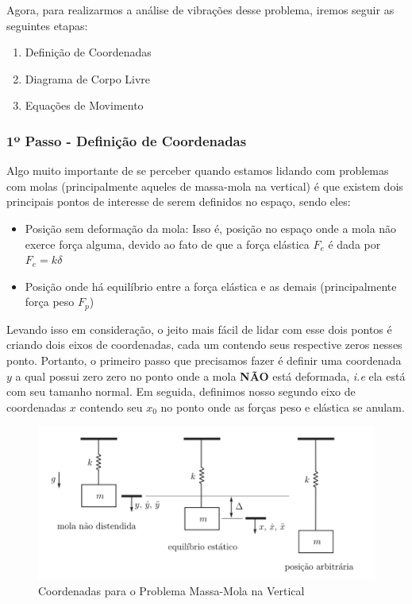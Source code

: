 \documentclass{article}
\begin{document}
                Agora, para realizarmos a análise de vibrações desse problema, iremos seguir as seguintes etapas:
                \begin{enumerate}
                    \item Definição de Coordenadas
                    \item Diagrama de Corpo Livre
                    \item Equações de Movimento
                \end{enumerate}

                \subsubsection*{1º Passo - Definição de Coordenadas}

                    Algo muito importante de se perceber quando estamos lidando com problemas com molas (principalmente aqueles de massa-mola na vertical) é que existem dois principais pontos de
                    interesse de serem definidos no espaço, sendo eles:
                    \begin{itemize}
                        \item Posição sem deformação da mola: Isso é, posição no espaço onde a mola não exerce força alguma, devido ao fato de que a força elástica $F_e$ é dada por $F_e = k \delta$
                        \item Posição onde há equilíbrio entre a força elástica e as demais (principalmente força peso $F_p$)
                    \end{itemize}

                    Levando isso em consideração, o jeito mais fácil de lidar com esse dois pontos é criando dois eixos de coordenadas, cada um contendo seus respective zeros nesses ponto. 
                    Portanto, o primeiro passo que precisamos fazer é definir uma coordenada $y$ a qual possui zero zero no ponto onde a mola
                    \textbf{NÃO} está deformada, \emph{i.e} ela está com seu tamanho normal.
                    Em seguida, definimos nosso segundo eixo de coordenadas $x$ contendo seu $x_0$ no ponto onde as forças peso e elástica se anulam.

                    \begin{figure}[h]
                        \centering
                        \includegraphics[width=.7\linewidth]{imgs/sis_mass_mola_1.png}
                        \caption{Coordenadas para o Problema Massa-Mola na Vertical}
                    \end{figure}
\end{document}
